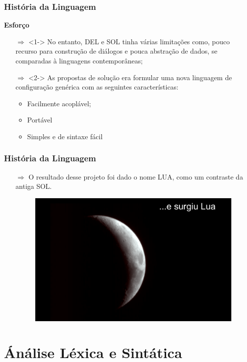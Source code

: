 \documentclass{beamer}
\begin{document}
\begin{frame}[fragile]
\frametitle{História da Linguagem}
	{\bf Esforço}\vspace{0.2cm}
	\begin{itemize}
		\item[$\Rightarrow$]<1-> No entanto, DEL e SOL tinha várias limitações como, pouco recurso para construção de diálogos e pouca abstração de dados, se comparadas à linguagens contemporâneas;
		\item[$\Rightarrow$]<2-> As propostas de solução era formular uma nova linguagem de configuração genérica com as seguintes características:
		\begin{itemize}
			\item<3-> Facilmente acoplável;
			\item<4-> Portável
			\item<5-> Simples e de sintaxe fácil
		\end{itemize}
	\end{itemize}
\end{frame}

\begin{frame}[fragile]
\frametitle{História da Linguagem}
	\begin{itemize}
		\item[$\Rightarrow$] O resultado desse projeto foi dado o nome LUA, como um contraste da antiga SOL.
		\begin{figure}[!htb]
			\centering
			\includegraphics[width=1\linewidth]{imagens/lua}
		\end{figure}
	\end{itemize}
\end{frame}

\section{Ánálise Léxica e Sintática}
\end{document}
